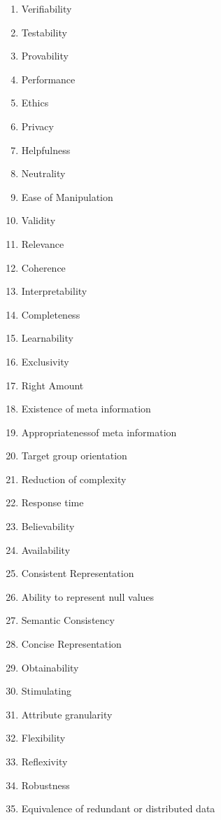 \begin{figure}[htb]
\begin{multicols}{3}
\begin{enumerate}
            \item Verifiability
            \item Testability
            \item Provability
            \item Performance
            \item Ethics
            \item Privacy
            \item Helpfulness
            \item Neutrality
            \item Ease of Manipulation
            \item Validity
            \item Relevance
            \item Coherence
            \item Interpretability
            \item Completeness
            \item Learnability
            \item Exclusivity
            \item Right Amount
            \item Existence of meta information
            \item Appropriateness\newline of meta information
            \item Target group orientation
            \item Reduction of complexity
            \item Response time
            \item Believability
            \item Availability
            \item Consistent Representation
            \item Ability to represent null values
            \item Semantic Consistency
            \item Concise Representation
            \item Obtainability
            \item Stimulating
            \item Attribute granularity
            \item Flexibility
            \item Reflexivity
            \item Robustness
            \item Equivalence of redundant or distributed data

\end{enumerate}
\end{multicols}
\end{figure}
